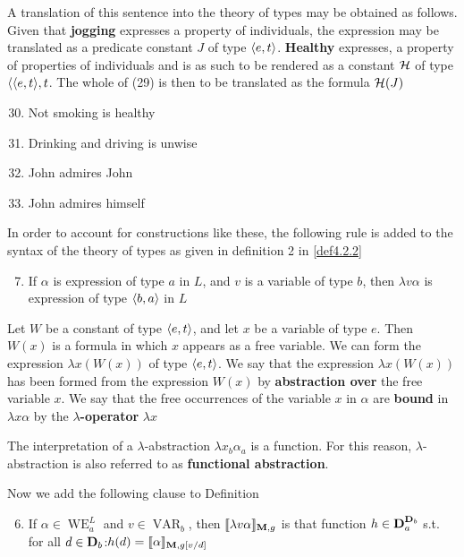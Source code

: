\documentclass[11pt]{article}
\DeclareMathOperator{\VAR}{VAR}
\DeclareMathOperator{\WE}{WE}
\begin{document}
A translation of this sentence into the theory of types may be obtained as
follows. Given that \textbf{jogging} expresses a property of individuals, the
expression may be translated as a predicate constant \(J\) of type \(\langle
    e,t\rangle\). \textbf{Healthy} expresses, a property of properties of individuals and is
as such to be rendered as a constant \(\mathcal{H}\) of type \(\langle\langle e,t\rangle,t\).
The whole of (29) is then to be translated as the formula \(\mathcal{H}(J)\)

\begin{enumerate}
\setcounter{enumi}{29}
\item Not smoking is healthy
\item Drinking and driving is unwise
\item John admires John
\item John admires himself
\end{enumerate}


In order to account for constructions like these, the following rule is
added to the syntax of the theory of types as given in definition 2 in
\ref{def4.2.2}
\begin{enumerate}
\setcounter{enumi}{6}
\item If \(\alpha\) is expression of type \(a\) in \(L\), and \(v\) is a variable
of type \(b\), then \(\lambda v\alpha\) is expression of type \(\langle b,a\rangle\) in
\(L\)
\end{enumerate}


Let \(W\) be a constant of type \(\langle e,t\rangle\), and let \(x\) be a variable
of type \(e\). Then \(W(x)\) is a formula in which \(x\) appears as a free
variable. We can form the expression \(\lambda x(W(x))\) of type \(\langle e,t\rangle\).
We say that the expression \(\lambda x(W(x))\) has been formed from the expression
\(W(x)\) by \textbf{abstraction over} the free variable \(x\). We say that the free
occurrences of the variable \(x\) in \(\alpha\) are \textbf{bound} in \(\lambda x\alpha\) by the
\textbf{\(\lambda\)-operator} \(\lambda x\)

The interpretation of a \(\lambda\)-abstraction \(\lambda x_b\alpha_a\) is a
function. For this reason, \(\lambda\)-abstraction is also referred to as
\textbf{functional abstraction}.

Now we add the following clause to Definition 
\begin{enumerate}
\setcounter{enumi}{5}
\item If \(\alpha\in\WE^L_a\) and \(v\in\VAR_b\), then \(\llbracket \lambda
       v\alpha\rrbracket_{\operatorname{\textbf{M}},g}\) is that function \(h\in\operatorname{\textbf{D}}_a^{\operatorname{\textbf{D}}_b}\) s.t.
for all \(d\in\operatorname{\textbf{D}}_b\):\(h(d)=\llbracket\alpha\rrbracket_{\operatorname{\textbf{M}},g[v/d]}\)
\end{enumerate}
\end{document}
